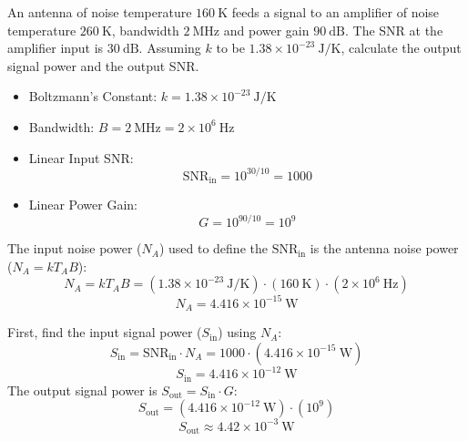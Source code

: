 

An antenna of noise temperature $160 \ \text{K}$ feeds a signal to an 
amplifier of noise temperature $260 \ \text{K}$, bandwidth $2 \ \text{MHz}$ and power 
gain $90 \ \text{dB}$. The SNR at the amplifier input is $30 \ \text{dB}$. Assuming $k$ to 
be $1.38 \times 10^{-23} \ \text{J/K}$, calculate the output signal power and the output 
SNR.


\begin{solutionblock}
\begin{itemize}
    \item Boltzmann's Constant: $k = 1.38 \times 10^{-23} \ \text{J/K}$
    \item Bandwidth: $B = 2 \ \text{MHz} = 2 \times 10^6 \ \text{Hz}$
    \item Linear Input SNR:
    \[
    \text{SNR}_{\text{in}} = 10^{30/10} = 1000
    \]
    \item Linear Power Gain:
    \[
    G = 10^{90/10} = 10^9
    \]
\end{itemize}
\end{solutionblock}


\begin{solutionblock}
The input noise power ($N_A$) used to define the $\text{SNR}_{\text{in}}$ is the antenna noise power ($N_A = k T_A B$):
\[
N_A = k T_A B = (1.38 \times 10^{-23} \ \text{J/K}) \cdot (160 \ \text{K}) \cdot (2 \times 10^6 \ \text{Hz})
\]
\[
N_A = 4.416 \times 10^{-15} \ \text{W}
\]
\end{solutionblock}


\begin{solutionblock}
First, find the input signal power ($S_{\text{in}}$) using $N_A$:
\[
S_{\text{in}} = \text{SNR}_{\text{in}} \cdot N_A = 1000 \cdot (4.416 \times 10^{-15} \ \text{W})
\]
\[
S_{\text{in}} = 4.416 \times 10^{-12} \ \text{W}
\]
The output signal power is $S_{\text{out}} = S_{\text{in}} \cdot G$:
\[
S_{\text{out}} = (4.416 \times 10^{-12} \ \text{W}) \cdot (10^9)
\]
\[
S_{\text{out}} \approx 4.42 \times 10^{-3} \ \text{W}
\]
\end{solutionblock}

